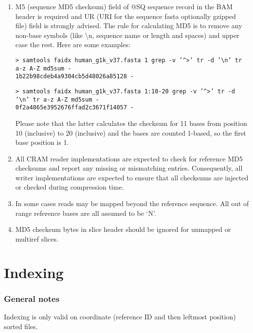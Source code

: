 \documentclass[a4paper]{article}
\begin{document}
\begin{enumerate}
\item M5 (sequence MD5 checksum) field of @SQ sequence record in the BAM header is 
required and UR (URI for the sequence fasta optionally gzipped file) field is strongly 
advised. The rule for calculating MD5 is to remove any non-base symbols (like \textbackslash{}n, 
sequence name or length and spaces) and upper case the rest. Here are some examples: 

\texttt{> samtools faidx human\_g1k\_v37.fasta 1 \textbar{} grep -v '\textasciicircum{}>' \textbar{} tr -d '\textbackslash{}n' \textbar{} tr a-z A-Z \textbar{} md5sum -\\
1b22b98cdeb4a9304cb5d48026a85128  -}

\texttt{> samtools faidx human\_g1k\_v37.fasta 1:10-20 \textbar{}grep -v '\textasciicircum{}\texttt{>}' \textbar{}tr -d '\textbackslash{}n' \textbar{}tr a-z A-Z \textbar{}md5sum -\\
0f2a4865e3952676ffad2c3671f14057  -}

Please note that the latter calculates the checksum for 11 bases from position 
10 (inclusive) to 20 (inclusive) and the bases are counted 1-based, so the first 
base position is 1. 

\item All CRAM reader implementations are expected to check for reference MD5 checksums 
and report any missing or mismatching entries. Consequently, all writer implementations 
are expected to ensure that all checksums are injected or checked during compression 
time. 

\item In some cases reads may be mapped beyond the reference sequence. All out of 
range reference bases are all assumed to be `N'. 

\item MD5 checksum bytes in slice header should be ignored for unmapped or multiref 
slices. 
\end{enumerate}

\section{Indexing}

\subsubsection*{General notes}

Indexing is only valid on coordinate (reference ID and then leftmost position) sorted files.
\end{document}
